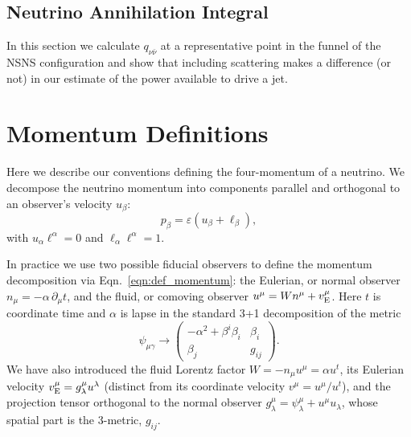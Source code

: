 \documentclass[aps,floatfix,prd,superscriptaddress,twocolumn]{revtex4-1}
\begin{document}
\subsection{Neutrino Annihilation Integral}
\label{ssec:q_nunu}
In this section we calculate $q_{\nu\bar{\nu}}$ at a representative point
in the funnel of the NSNS configuration and show that including scattering makes
a difference (or not) in our estimate of the power available to drive a jet.

\appendix

\section{Momentum Definitions}
\label{sec:def_momentum}
Here we describe our conventions defining the four-momentum of a neutrino.
We decompose the neutrino momentum into components parallel and orthogonal to
an observer's velocity $u_\beta$:
\begin{equation}
  \label{eqn:def_momentum_2}
  p_\beta = \varepsilon (u_\beta + \ell_\beta),
\end{equation}
with $u_\alpha\ell^\alpha=0$ and $\ell_\alpha\ell^\alpha=1$.

In practice we use two possible fiducial observers to define the momentum
decomposition via Eqn.~\ref{eqn:def_momentum}: the Eulerian,
or normal observer $n_\mu=-\alpha \,\partial_\mu t$,
and the fluid, or comoving observer
$u^\mu=Wn^\mu+v_{\rm E}^\mu$.
Here $t$ is coordinate time and $\alpha$ is lapse
in the standard 3+1 decomposition of the metric
\begin{equation}
  \label{eqn:adm_metric}
  \psi_{\mu\gamma} \rightarrow
  \left(
  \begin{matrix}
    -\alpha^2 + \beta^i \beta_i  & \beta_i \\
    \beta_j                      & g_{ij}
  \end{matrix}
  \right).
\end{equation}
We have also introduced
the fluid Lorentz factor $W=-n_\mu u^\mu=\alpha u^t$,
its Eulerian velocity $v_{\rm E}^\mu=g^\mu_\lambda u^\lambda$
(distinct from its coordinate velocity $v^\mu=u^\mu/u^t$),
and the projection tensor orthogonal to the normal observer
$g^\mu_\lambda=\psi^\mu_\lambda+u^\mu u_\lambda$,
whose spatial part is the 3-metric, $g_{ij}$.
\end{document}
